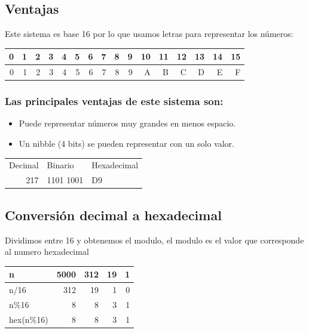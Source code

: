 \documentclass[11pt]{article}
\begin{document}
\subsection{Ventajas}
\label{sec:org2f05cc3}
Este sistema es base 16 por lo que usamos letras para representar los números:

\begin{center}
\begin{tabular}{|r|r|r|r|r|r|r|r|r|r|r|r|r|r|r|r|}
\hline
0 & 1 & 2 & 3 & 4 & 5 & 6 & 7 & 8 & 9 & 10 & 11 & 12 & 13 & 14 & 15\\
\hline
0 & 1 & 2 & 3 & 4 & 5 & 6 & 7 & 8 & 9 & A & B & C & D & E & F\\
\hline
\end{tabular}
\end{center}

\subsubsection*{Las principales ventajas de este sistema son:}
\label{sec:orgd2634ce}
\begin{itemize}
\item Puede representar números muy grandes en menos espacio.
\item Un nibble (4 bits) se pueden representar con un solo valor.
\end{itemize}

\begin{center}
\begin{tabular}{|r|l|l|}
\hline
Decimal & Binario & Hexadecimal\\
217 & 1101 1001 & D9\\
\hline
\end{tabular}
\end{center}

\subsection{Conversión decimal a hexadecimal}
\label{sec:org8d12ec8}
Dividimos entre 16 y obtenemos el modulo, el modulo es el valor que corresponde al numero hexadecimal

\begin{center}
\begin{tabular}{|l|r|r|r|r|}
\hline
n & 5000 & 312 & 19 & 1\\
\hline
n/16 & 312 & 19 & 1 & 0\\
n\%16 & 8 & 8 & 3 & 1\\
hex(n\%16) & 8 & 8 & 3 & 1\\
\hline
\end{tabular}
\end{center}
\end{document}

